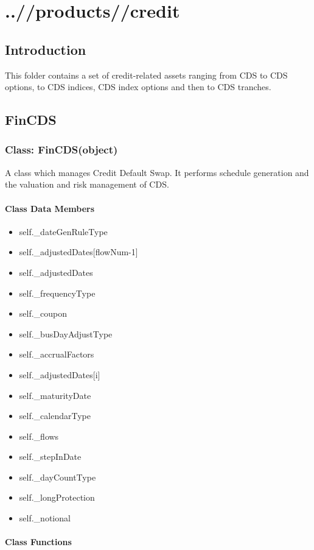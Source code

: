 \documentclass[twoside,11pt]{book}
\begin{document}
\chapter{..//products//credit}
\section{Introduction}
This folder contains a set of credit-related assets ranging from CDS to CDS options, to CDS indices, CDS index options and then to CDS tranches. 
\newpage
\section{FinCDS}

\subsection{Class: FinCDS(object)}
A class which manages Credit Default Swap. It performs schedule generation and the valuation and risk management of CDS. 

\subsubsection{Class Data Members}
\begin{itemize}
\item{self.\_dateGenRuleType}
\item{self.\_adjustedDates[flowNum-1]}
\item{self.\_adjustedDates}
\item{self.\_frequencyType}
\item{self.\_coupon}
\item{self.\_busDayAdjustType}
\item{self.\_accrualFactors}
\item{self.\_adjustedDates[i]}
\item{self.\_maturityDate}
\item{self.\_calendarType}
\item{self.\_flows}
\item{self.\_stepInDate}
\item{self.\_dayCountType}
\item{self.\_longProtection}
\item{self.\_notional}
\end{itemize}

\subsubsection{Class Functions}
\end{document}
